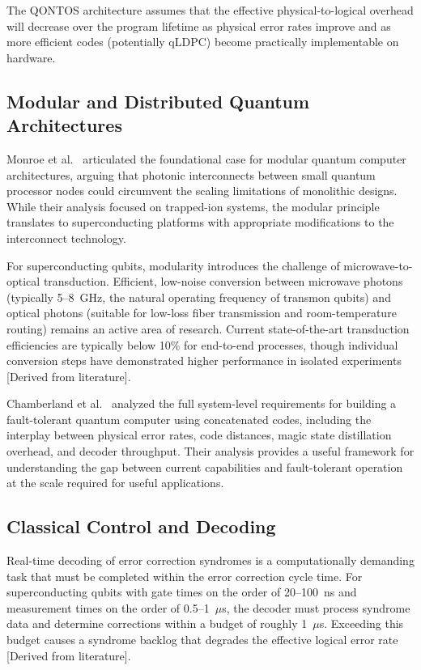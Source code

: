 \documentclass[conference]{IEEEtran}
\begin{document}
The QONTOS architecture assumes that the effective physical-to-logical overhead will decrease over the program lifetime as physical error rates improve and as more efficient codes (potentially qLDPC) become practically implementable on hardware.

\subsection{Modular and Distributed Quantum Architectures}

Monroe et al.~\cite{monroe2014} articulated the foundational case for modular quantum computer architectures, arguing that photonic interconnects between small quantum processor nodes could circumvent the scaling limitations of monolithic designs. While their analysis focused on trapped-ion systems, the modular principle translates to superconducting platforms with appropriate modifications to the interconnect technology.

For superconducting qubits, modularity introduces the challenge of microwave-to-optical transduction. Efficient, low-noise conversion between microwave photons (typically 5--8~GHz, the natural operating frequency of transmon qubits) and optical photons (suitable for low-loss fiber transmission and room-temperature routing) remains an active area of research. Current state-of-the-art transduction efficiencies are typically below 10\% for end-to-end processes, though individual conversion steps have demonstrated higher performance in isolated experiments [Derived from literature].

Chamberland et al.~\cite{chamberland2022} analyzed the full system-level requirements for building a fault-tolerant quantum computer using concatenated codes, including the interplay between physical error rates, code distances, magic state distillation overhead, and decoder throughput. Their analysis provides a useful framework for understanding the gap between current capabilities and fault-tolerant operation at the scale required for useful applications.

\subsection{Classical Control and Decoding}

Real-time decoding of error correction syndromes is a computationally demanding task that must be completed within the error correction cycle time. For superconducting qubits with gate times on the order of 20--100~ns and measurement times on the order of 0.5--1~$\mu$s, the decoder must process syndrome data and determine corrections within a budget of roughly 1~$\mu$s. Exceeding this budget causes a syndrome backlog that degrades the effective logical error rate [Derived from literature].
\end{document}
